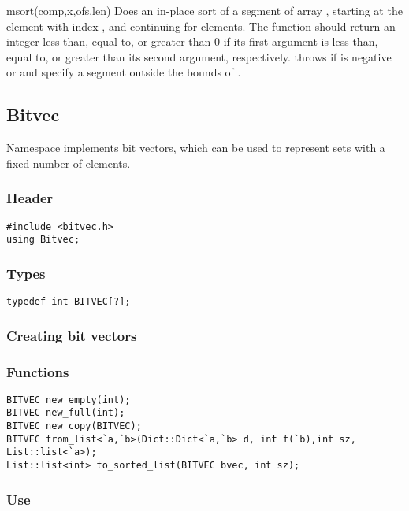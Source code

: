 \begin{defun}{msort}{(comp,x,ofs,len)}
  Does an in-place sort of a segment of array , starting at the
  element with index , and continuing for  elements.
  The function  should return an integer less than, equal
  to, or greater than 0 if its first argument is less than, equal to,
  or greater than its second argument, respectively.  
  throws  if  is
  negative or  and  specify a segment outside the
  bounds of .
\end{defun}

\subsection{Bitvec}

Namespace  implements bit vectors, which can be used to
represent sets with a fixed number of elements.

\subsubsection*{Header}
\begin{verbatim}
#include <bitvec.h>
using Bitvec;
\end{verbatim}

\subsubsection*{Types}
\begin{verbatim}
typedef int BITVEC[?];
\end{verbatim}

\subsubsection*{Creating bit vectors}

\subsubsection*{Functions}
\begin{verbatim}
BITVEC new_empty(int);
BITVEC new_full(int);
BITVEC new_copy(BITVEC);
BITVEC from_list<`a,`b>(Dict::Dict<`a,`b> d, int f(`b),int sz, List::list<`a>);
List::list<int> to_sorted_list(BITVEC bvec, int sz);
\end{verbatim}

\subsubsection*{Use}

